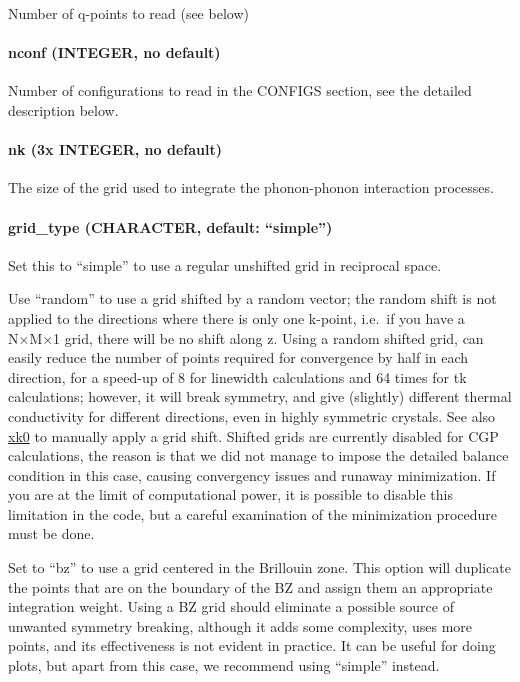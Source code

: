 \documentclass[
]{article}
\begin{document}
Number of q-points to read (see below)

\hypertarget{nconf-integer-no-default}{%
\paragraph{nconf (INTEGER, no default)}\label{nconf-integer-no-default}}

Number of configurations to read in the CONFIGS section, see the
detailed description below.

\hypertarget{nk-3x-integer-no-default-1}{%
\paragraph{nk (3x INTEGER, no
default)}\label{nk-3x-integer-no-default-1}}

The size of the grid used to integrate the phonon-phonon interaction
processes.

\hypertarget{grid_type-character-default-simple-1}{%
\paragraph{\texorpdfstring{grid\_type (CHARACTER, default:
\enquote{simple})}{grid\_type (CHARACTER, default: ``simple'')}}\label{grid_type-character-default-simple-1}}

Set this to \enquote{simple} to use a regular unshifted grid in
reciprocal space.

Use \enquote{random} to use a grid shifted by a random vector; the
random shift is not applied to the directions where there is only one
k-point, i.e.~if you have a N×M×1 grid, there will be no shift along z.
Using a random shifted grid, can easily reduce the number of points
required for convergence by half in each direction, for a speed-up of 8
for linewidth calculations and 64 times for tk calculations; however, it
will break symmetry, and give (slightly) different thermal conductivity
for different directions, even in highly symmetric crystals. See also
\protect\hyperlink{xk0-3x-real-default-000}{xk0} to manually apply a
grid shift. Shifted grids are currently disabled for CGP calculations,
the reason is that we did not manage to impose the detailed balance
condition in this case, causing convergency issues and runaway
minimization. If you are at the limit of computational power, it is
possible to disable this limitation in the code, but a careful
examination of the minimization procedure must be done.

Set to \enquote{bz} to use a grid centered in the Brillouin zone. This
option will duplicate the points that are on the boundary of the BZ and
assign them an appropriate integration weight. Using a BZ grid should
eliminate a possible source of unwanted symmetry breaking, although it
adds some complexity, uses more points, and its effectiveness is not
evident in practice. It can be useful for doing plots, but apart from
this case, we recommend using \enquote{simple} instead.
\end{document}
